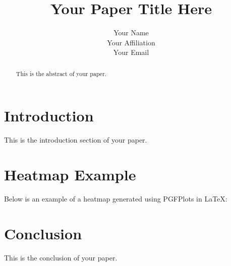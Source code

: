 \documentclass{article} %
\begin{document}
	
	\title{Your Paper Title Here}
	\author{Your Name \\ Your Affiliation \\ Your Email}
	\maketitle
	
	\begin{abstract}
		This is the abstract of your paper.
	\end{abstract}
	
	\section{Introduction}
	This is the introduction section of your paper.
	
	\section{Heatmap Example}
	Below is an example of a heatmap generated using PGFPlots in LaTeX:
	
	
	\section{Conclusion}
	This is the conclusion of your paper.
	
\end{document}
